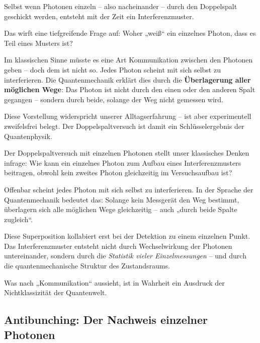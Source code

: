 \begin{tcolorbox}[didaktikbox, title=Fazit: Ein scheinbar paradoxes Verhalten]
	\label{box:Fazit ein scheinbarer}
	\small
	Selbst wenn Photonen einzeln – also nacheinander – durch den Doppelspalt geschickt werden, entsteht mit der Zeit ein Interferenzmuster.
	
	Das wirft eine tiefgreifende Frage auf: Woher „weiß“ ein einzelnes Photon, dass es Teil eines Musters ist?
	
	Im klassischen Sinne müsste es eine Art Kommunikation zwischen den Photonen geben – doch dem ist nicht so. Jedes Photon scheint mit sich selbst zu interferieren. Die Quantenmechanik erklärt dies durch die \textbf{Überlagerung aller möglichen Wege}: Das Photon ist nicht durch den einen oder den anderen Spalt gegangen – sondern durch beide, solange der Weg nicht gemessen wird.
	
	Diese Vorstellung widerspricht unserer Alltagserfahrung – ist aber experimentell zweifelsfrei belegt. Der Doppelspaltversuch ist damit ein Schlüsselergebnis der Quantenphysik.
	
	Der Doppelspaltversuch mit einzelnen Photonen stellt unser klassisches Denken infrage:  
	Wie kann ein einzelnes Photon zum Aufbau eines Interferenzmusters beitragen, obwohl kein zweites Photon gleichzeitig im Versuchsaufbau ist?
	
	Offenbar scheint jedes Photon mit sich selbst zu interferieren. In der Sprache der Quantenmechanik bedeutet das: Solange kein Messgerät den Weg bestimmt, überlagern sich alle möglichen Wege gleichzeitig – auch „durch beide Spalte zugleich“.
	
	Diese Superposition kollabiert erst bei der Detektion zu einem einzelnen Punkt. Das Interferenzmuster entsteht nicht durch Wechselwirkung der Photonen untereinander, sondern durch die \emph{Statistik vieler Einzelmessungen} – und durch die quantenmechanische Struktur des Zustandsraums.
	
	Was nach „Kommunikation“ aussieht, ist in Wahrheit ein Ausdruck der Nichtklassizität der Quantenwelt.
\end{tcolorbox}

\subsection{Antibunching: Der Nachweis einzelner \newline Photonen}

